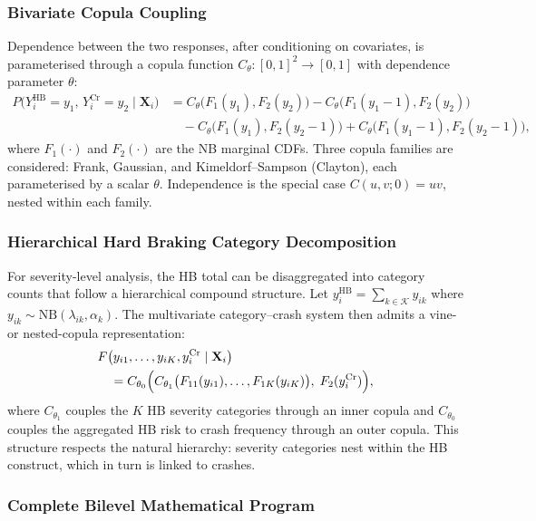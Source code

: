 \documentclass[letterpaper,8pt]{extarticle}  %
\begin{document}
\begin{doublespacing}
\begin{linenumbers}
\subsubsection*{Bivariate Copula Coupling}

Dependence between the two responses, after conditioning on covariates, is parameterised through a copula function $C_\theta: [0,1]^2 \to [0,1]$ with dependence parameter $\theta$:
\begin{align}
  P\bigl(Y_i^{\text{HB}} = y_1,\, Y_i^{\text{Cr}} = y_2 \mid \mathbf{X}_i\bigr)
    &= C_\theta\bigl(F_1(y_1), F_2(y_2)\bigr)
     - C_\theta\bigl(F_1(y_1-1), F_2(y_2)\bigr) \nonumber\\
    &\quad - C_\theta\bigl(F_1(y_1), F_2(y_2-1)\bigr)
     + C_\theta\bigl(F_1(y_1-1), F_2(y_2-1)\bigr), \label{eq:mathprogram-copula-rect}
\end{align}
where $F_1(\cdot)$ and $F_2(\cdot)$ are the NB marginal CDFs. Three copula families are considered: Frank, Gaussian, and Kimeldorf--Sampson (Clayton), each parameterised by a scalar $\theta$. Independence is the special case $C(u,v; 0) = uv$, nested within each family.

\subsubsection*{Hierarchical Hard Braking Category Decomposition}

For severity-level analysis, the HB total can be disaggregated into category counts that follow a hierarchical compound structure. Let $y_i^{\text{HB}} = \sum_{k \in \mathcal{K}} y_{ik}$ where $y_{ik} \sim \text{NB}(\lambda_{ik}, \alpha_k)$. The multivariate category--crash system then admits a vine- or nested-copula representation:
\begin{align}
  &F\bigl(y_{i1},\dots,y_{iK}, y_i^{\text{Cr}} \mid \mathbf{X}_i\bigr) \nonumber\\
  &\quad = C_{\theta_0}\Bigl(
       C_{\theta_1}\bigl(F_{11}(y_{i1}),\dots,F_{1K}(y_{iK})\bigr),\;
       F_2(y_i^{\text{Cr}})
     \Bigr),
\end{align}
where $C_{\theta_1}$ couples the $K$ HB severity categories through an inner copula and $C_{\theta_0}$ couples the aggregated HB risk to crash frequency through an outer copula. This structure respects the natural hierarchy: severity categories nest within the HB construct, which in turn is linked to crashes.

\subsubsection*{Complete Bilevel Mathematical Program}


\end{linenumbers}
\end{doublespacing}
\end{document}
